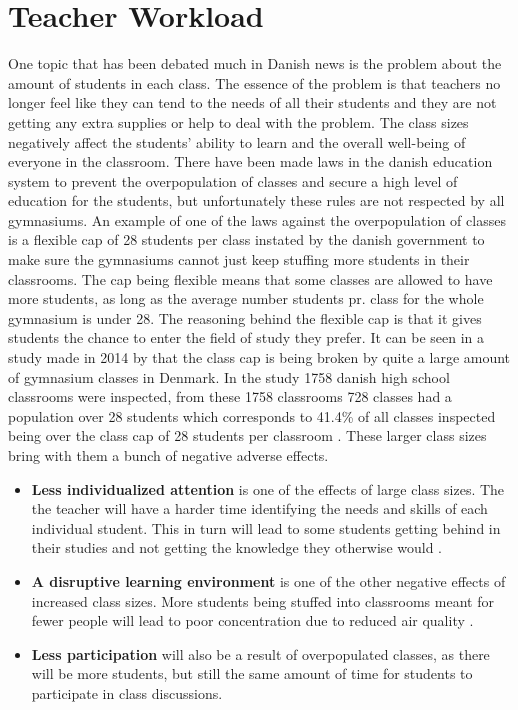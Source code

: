 \section{Teacher Workload}
\label{sec:teacher_workload}
One topic that has been debated much in Danish news is the problem about the amount of students in each class. The essence of the problem is that teachers no longer feel like they can tend to the needs of all their students and they are not getting any extra supplies or help to deal with the problem. The class sizes negatively affect the students' ability to learn and the overall well-being of everyone in the classroom\cite{Romme-Mlby2018GymnasierGymnasieskolen}. There have been made laws in the danish education system to prevent the overpopulation of classes and secure a high level of education for the students, but unfortunately these rules are not respected by all gymnasiums. An example of one of the laws against the overpopulation of classes is a flexible cap of 28 students per class instated by the danish government to make sure the gymnasiums cannot just keep stuffing more students in their classrooms. The cap being flexible means that some classes are allowed to have more students, as long as the average number students pr. class for the whole gymnasium is under 28. The reasoning behind the flexible cap is that it gives students the chance to enter the field of study they prefer. It can be seen in a study made in 2014 by  that the class cap is being broken by quite a large amount of gymnasium classes in Denmark. In the study 1758 danish high school classrooms were inspected, from these 1758 classrooms 728 classes had a population over 28 students which corresponds to 41.4\% of all classes inspected being over the class cap of 28 students per classroom \cite{KlassestrrelsersGymnasiet}. These larger class sizes bring with them a bunch of negative adverse effects.

\begin{itemize} 
    \item \textbf{Less individualized attention} is one of the effects of large class sizes. The the teacher will have a harder time identifying the needs and skills of each individual student. This in turn will lead to some students getting behind in their studies and not getting the knowledge they otherwise would \cite{Gibori2012TheStudents}.
    \item \textbf{A disruptive learning environment} is one of the other negative effects of increased class sizes. More students being stuffed into classrooms meant for fewer people will lead to poor concentration due to reduced air quality \cite{Gibori2012TheStudents}.
    \item \textbf{Less participation} will also be a result of overpopulated classes, as there will be more students, but still the same amount of time for students to participate in class discussions\cite{Gibori2012TheStudents}. 
\end{itemize}


